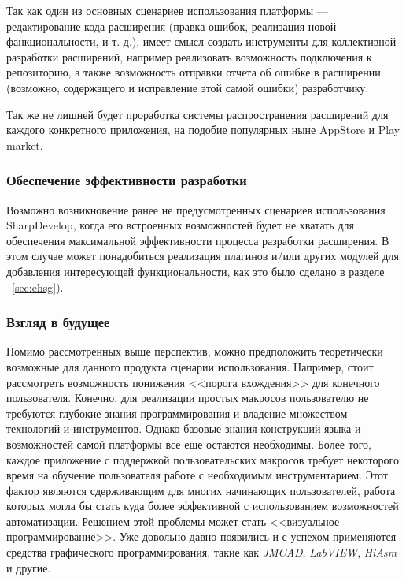 Так как один из основных сценариев использования платформы --- редактирование кода расширения (правка ошибок, реализация новой фанкциональности, и т. д.), имеет смысл создать инструменты для коллективной разработки расширений, например реализовать возможность подключения к репозиторию, а также возможность отправки отчета об ошибке в расширении (возможно, содержащего и исправление этой самой ошибки) разработчику.

Так же не лишней будет проработка системы распространения расширений для каждого конкретного приложения, на подобие популярных ныне AppStore и Play market.

\subsubsection{Обеспечение эффективности разработки}

Возможно возникновение ранее не предусмотренных сценариев использования SharpDevelop, когда его встроенных возможностей будет не хватать для обеспечения максимальной эффективности процесса разработки расширения. В этом случае может понадобиться реализация плагинов и/или других модулей для добавления интересующей функциональности, как это было сделано в разделе ~\ref{sec:ehsg}).

\subsubsection{Взгляд в будущее}

Помимо рассмотренных выше перспектив, можно предположить теоретически возможные для данного продукта сценарии использования. Например, стоит рассмотреть возможность понижения <<порога вхождения>> для конечного пользователя. Конечно, для реализации простых макросов пользователю не требуются глубокие знания программирования и владение множеством технологий и инструментов. Однако базовые знания конструкций языка и возможностей самой платформы все еще остаются необходимы. Более того, каждое приложение с поддержкой пользовательских макросов требует некоторого время на обучение пользователя работе с необходимым  инструментарием. Этот фактор являются сдерживающим для многих начинающих пользователей, работа которых могла бы стать куда более эффективной с использованием возможностей автоматизации. Решением этой проблемы может стать <<визуальное программирование>>. Уже довольно давно появились и с успехом применяются средства графического программирования, такие как {\it JMCAD}, {\it LabVIEW}, {\it HiAsm} и другие.

